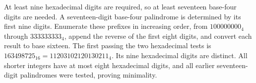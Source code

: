 At least nine hexadecimal digits are required, so at least seventeen base-four digits are needed. A seventeen-digit base-four palindrome is determined by its first nine digits. Enumerate these prefixes in increasing order, from $100000000_4$ through $333333333_4$, append the reverse of the first eight digits, and convert each result to base sixteen. The first passing the two hexadecimal tests is $\boxed{163498725_{16}}=11203102120130211_4$. Its nine hexadecimal digits are distinct. All shorter integers have at most eight hexadecimal digits, and all earlier seventeen-digit palindromes were tested, proving minimality.
